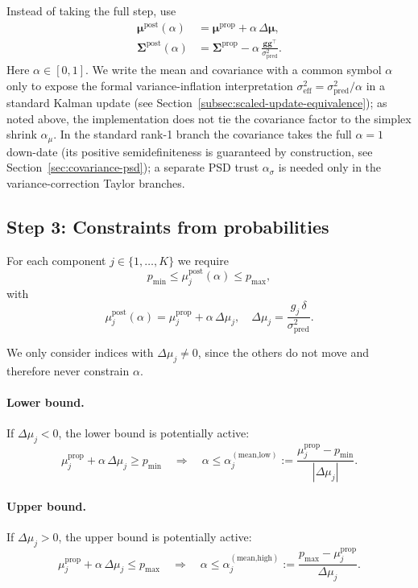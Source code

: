 \documentclass[11pt]{article}
\begin{document}
Instead of taking the full step, use
\begin{align}
  \boldsymbol{\mu}^{\text{post}}(\alpha)
  &=
  \boldsymbol{\mu}^{\text{prop}} +
  \alpha\,\Delta\boldsymbol{\mu},
  \label{eq:alpha-mean}
  \\
  \boldsymbol{\Sigma}^{\text{post}}(\alpha)
  &=
  \boldsymbol{\Sigma}^{\text{prop}} -
  \alpha\,\frac{\mathbf{g}\mathbf{g}^\top}{\sigma^2_{\text{pred}}}.
  \label{eq:alpha-cov}
\end{align}
Here \(\alpha\in[0,1]\).  We write the mean and covariance with a common
symbol \(\alpha\) only to expose the formal variance-inflation interpretation
\(\sigma^2_{\text{eff}} = \sigma^2_{\text{pred}}/\alpha\) in a standard Kalman
update (see Section~\ref{subsec:scaled-update-equivalence}); as noted above,
the implementation does not tie the covariance factor to the simplex shrink
\(\alpha_\mu\). In the standard rank-1 branch the covariance takes the full
\(\alpha=1\) down-date (its positive semidefiniteness is guaranteed by
construction, see Section~\ref{sec:covariance-psd}); a separate PSD trust
\(\alpha_\sigma\) is needed only in the variance-correction Taylor branches.

\subsection{Step 3: Constraints from probabilities}

For each component \(j\in\{1,\dots,K\}\) we require
\[
  p_{\min} \le \mu^{\text{post}}_j(\alpha) \le p_{\max},
\]
with
\[
  \mu^{\text{post}}_j(\alpha)
  =
  \mu^{\text{prop}}_j + \alpha\,\Delta\mu_j,\quad
  \Delta\mu_j
  =
  \frac{g_j\,\delta}{\sigma^2_{\text{pred}}}.
\]

We only consider indices with \(\Delta\mu_j\neq 0\), since the others do not
move and therefore never constrain \(\alpha\).

\paragraph{Lower bound.}
If \(\Delta\mu_j < 0\), the lower bound is potentially active:
\[
  \mu^{\text{prop}}_j + \alpha\,\Delta\mu_j \ge p_{\min}
  \quad\Longrightarrow\quad
  \alpha
  \le
  \alpha^{(\text{mean,low})}_j
  :=
  \frac{\mu^{\text{prop}}_j - p_{\min}}{|\Delta\mu_j|}.
\]

\paragraph{Upper bound.}
If \(\Delta\mu_j > 0\), the upper bound is potentially active:
\[
  \mu^{\text{prop}}_j + \alpha\,\Delta\mu_j \le p_{\max}
  \quad\Longrightarrow\quad
  \alpha
  \le
  \alpha^{(\text{mean,high})}_j
  :=
  \frac{p_{\max} - \mu^{\text{prop}}_j}{\Delta\mu_j}.
\]
\end{document}
